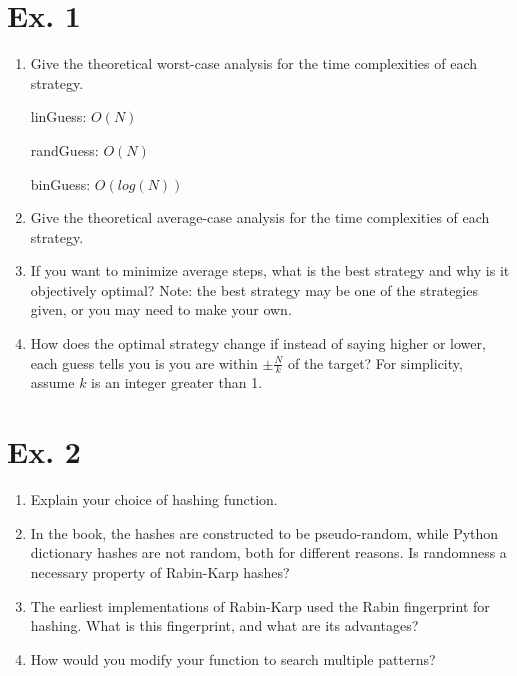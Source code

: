 \documentclass{article}
\begin{document}
\section{Ex. 1}
\begin{enumerate}
    \item Give the theoretical worst-case analysis for the time complexities of each strategy.
    
    linGuess: $O(N)$
    
    randGuess: $O(N)$
    
    binGuess: $O(log(N))$
    
    \item Give the theoretical average-case analysis for the time complexities of each strategy.
    
    \item If you want to minimize average steps, what is the best strategy and why is it objectively optimal? Note: the best strategy may be one of the strategies given, or you may need to make your own.
    
    \item How does the optimal strategy change if instead of saying higher or lower, each guess tells you is you are within $\pm \frac{N}{k}$ of the target? For simplicity, assume $k$ is an integer greater than 1.

\end{enumerate}

\section{Ex. 2}
\begin{enumerate}
    \item Explain your choice of hashing function.  
    
    \item  In the book, the hashes are constructed to be pseudo-random, while Python dictionary hashes are not random, both for different reasons. Is randomness a necessary property of Rabin-Karp hashes?
    
    \item The earliest implementations of Rabin-Karp used the Rabin fingerprint for hashing. What is this fingerprint, and what are its advantages?  
    
    \item How would you modify your function to search multiple patterns? 

\end{enumerate}
\end{document}
